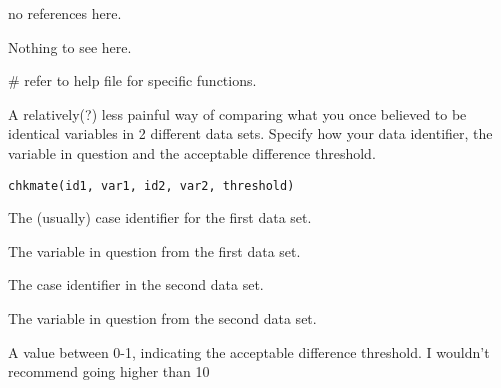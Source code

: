 \documentclass[letterpaper]{book}
\begin{document}
%
\begin{References}\relax
no references here. 
\end{References}
%
\begin{SeeAlso}\relax
Nothing to see here. 
\end{SeeAlso}
%
\begin{Examples}
\begin{ExampleCode}
# refer to help file for specific functions. 
\end{ExampleCode}
\end{Examples}
%
\begin{Description}\relax

A relatively(?) less painful way of comparing what you once believed to be identical variables in 2 different data sets. 
Specify how your data identifier, the variable in question and the acceptable difference threshold.
\end{Description}
%
\begin{Usage}
\begin{verbatim}
chkmate(id1, var1, id2, var2, threshold)
\end{verbatim}
\end{Usage}
%
\begin{Arguments}
\begin{ldescription}
\item[\code{id1}] 

The (usually) case identifier for the first data set. 

\item[\code{var1}] 

The variable in question from the first data set. 

\item[\code{id2}] 

The case identifier in the second data set. 

\item[\code{var2}] 

The variable in question from the second data set. 

\item[\code{threshold}] 

A value between 0-1, indicating the acceptable difference threshold. I wouldn't recommend going higher than 10

\end{ldescription}
\end{Arguments}
\end{document}
